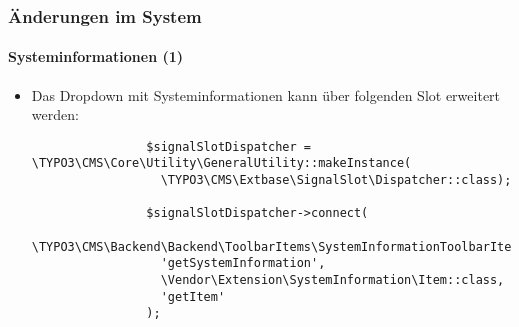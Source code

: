 \begin{frame}[fragile]
	\frametitle{Änderungen im System}
	\framesubtitle{Systeminformationen (1)}

	\lstset{basicstyle=\tiny\ttfamily}

	\begin{itemize}
		\item Das Dropdown mit Systeminformationen kann über folgenden Slot erweitert werden:

			\begin{lstlisting}
				$signalSlotDispatcher = \TYPO3\CMS\Core\Utility\GeneralUtility::makeInstance(
				  \TYPO3\CMS\Extbase\SignalSlot\Dispatcher::class);

				$signalSlotDispatcher->connect(
				  \TYPO3\CMS\Backend\Backend\ToolbarItems\SystemInformationToolbarItem::class,
				  'getSystemInformation',
				  \Vendor\Extension\SystemInformation\Item::class,
				  'getItem'
				);
			\end{lstlisting}

	\end{itemize}

\end{frame}

